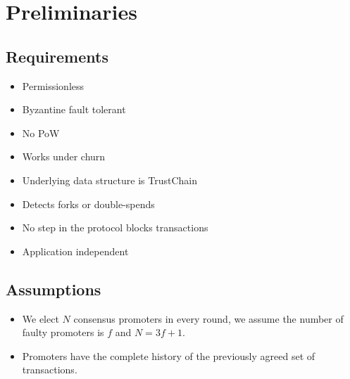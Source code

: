 \section{Preliminaries}

\subsection{Requirements}
\begin{itemize}
\item Permissionless
\item Byzantine fault tolerant
\item No PoW
\item Works under churn
\item Underlying data structure is TrustChain
\item Detects forks or double-spends
\item No step in the protocol blocks transactions
\item Application independent
\end{itemize}

\subsection{Assumptions}
\begin{itemize}
\item We elect $N$ consensus promoters in every round, we assume the number of
  faulty promoters is $f$ and $N = 3f + 1$.
\item Promoters have the complete history of the previously agreed set of
  transactions.
\end{itemize}

